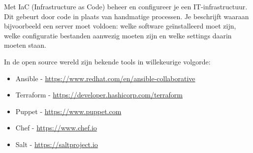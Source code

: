 Met IaC (Infrastructure as Code) beheer en configureer je een IT-infrastructuur. Dit gebeurt door code in plaats van handmatige processen. Je beschrijft waaraan bijvoorbeeld een server moet voldoen: welke software ge\"installeerd moet zijn, welke configuratie bestanden aanwezig moeten zijn en welke settings daarin moeten staan.

In de open source wereld zijn bekende tools in willekeurige volgorde:
\begin{itemize}
\item Ansible - \url{https://www.redhat.com/en/ansible-collaborative}
\item Terraform - \url{https://developer.hashicorp.com/terraform}
\item Puppet - \url{https://www.puppet.com}
\item Chef - \url{https://www.chef.io}
\item Salt - \url{https://saltproject.io}
\end{itemize}

